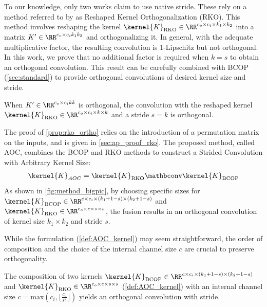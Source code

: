     To our knowledge, only two works \cite{serrurier_achieving_2021,serrurier_explainable_nodate} claim to use native stride. These rely on a method referred to by \cite{li_preventing_2019} as Reshaped Kernel Orthogonalization (RKO). This method involves reshaping the kernel $\kernel{K}_{\text{RKO}} \in \RR^{c_o \times c_i \times k_1 \times k_2}$ into a matrix $K' \in \RR^{c_o \times c_i k_1 k_2}$ and orthogonalizing it. In general, with the adequate multiplicative factor, the resulting convolution is 1-Lipschitz but not orthogonal. 
    In this work, we prove that no additional factor is required when $k=s$ to obtain an orthogonal convolution. This result can be carefully combined with BCOP (\cref{sec:standard}) to provide orthogonal convolutions of desired kernel size and stride.
    \begin{proposition}[RKO gives an orthogonal kernel\label{prop:rko_ortho} when $k_1 = k_2 = s$]
        When $K' \in \RR^{c_o \times c_i k k}$ is orthogonal, the convolution with the reshaped kernel $\kernel{K}_{\text{RKO}} \in \RR^{c_o \times c_i \times k \times k}$ and a stride $s=k$ is orthogonal.
    \end{proposition}

    The proof of \cref{prop:rko_ortho} relies on the introduction of a permutation matrix on the inputs, and is given in \cref{sec:ap_proof_rko}.
    The proposed method, called AOC, combines the BCOP and RKO methods to construct a Strided Convolution with Arbitrary Kernel Size:
    \begin{align}
        \kernel{K}_{AOC}= \kernel{K}_{\text{RKO}} \mathbconv \kernel{K}_{\text{BCOP}} \label{def:AOC_kernel}
    \end{align}
    As shown in \cref{fig:method_bigpic}, by choosing specific sizes for $\kernel{K}_{\text{BCOP}} \in \RR^{c \times c_i \times (k_1+1-s) \times (k_2+1-s)}$ and $\kernel{K}_{\text{RKO}} \in \RR^{c_o \times c \times s \times s}$, the fusion results in an orthogonal convolution of kernel size $k_1 \times k_2$ and stride $s$. 
    
    While the formulation (\cref{def:AOC_kernel}) may seem straightforward, the order of composition and the choice of the internal channel size $c$ are crucial to preserve orthogonality.
    \begin{proposition}
        \label{prop:ortho_stride}
        The composition  of two kernels $\kernel{K}_{\text{BCOP}} \in \RR^{c \times c_i \times (k_1+1-s) \times (k_2+1-s)}$ and $\kernel{K}_{\text{RKO}} \in \RR^{c_o \times c \times s \times s}$ (\cref{def:AOC_kernel}) with an internal channel size $c = \text{max}(c_i, \lfloor\frac{c_o}{s^2}\rfloor)$ yields an orthogonal convolution with stride. %
    \end{proposition}
    
